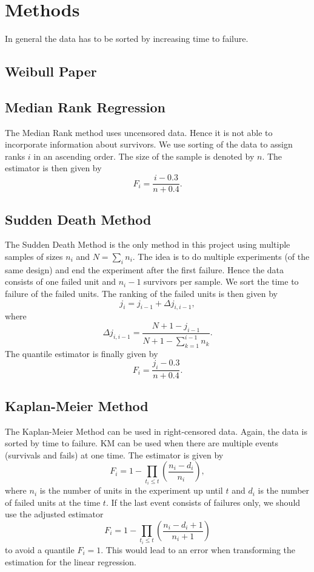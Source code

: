 \section{Methods}
In general the data has to be sorted by increasing time to failure.

\subsection{Weibull Paper}

\subsection{Median Rank Regression}
The Median Rank method uses uncensored data. Hence it is not able to incorporate information about survivors. 
We use sorting of the data to assign ranks $i$ in an ascending order. The size of the sample is denoted by $n$. The estimator is then given by
$$ F_i = \frac{i - 0.3}{n + 0.4}.$$

\subsection{Sudden Death Method}
The Sudden Death Method is the only method in this project using multiple samples of sizes $n_i$ and $N = \sum_{i}n_i$. The idea is to do multiple experiments (of the same design) and end the experiment after the first failure. Hence the data consists of one failed unit and $n_i - 1$ survivors per sample. We sort the time to failure of the failed units. The ranking of the failed units is then given by
$$ j_i = j_{i-1} + \Delta j_{i,i-1}, $$
where
$$ \Delta j_{i, i-1} = \frac{N + 1 - j_{i-1}}{N + 1 - \sum_{k=1}^{i-1} n_k}.$$
The quantile estimator is finally given by
$$ F_i = \frac{j_i - 0.3}{n + 0.4}. $$

\subsection{Kaplan-Meier Method}
The Kaplan-Meier Method can be used in right-censored data. Again, the data is sorted by time to failure. KM can be used when there are multiple events (survivals and fails) at one time.
The estimator is given by
$$ F_i = 1 - \prod_{t_i \leq t} \left( \frac{n_i - d_i}{n_i} \right), $$
where $n_i$ is the number of units in the experiment up until $t$ and $d_i$ is the number of failed units at the time $t$.
If the last event consists of failures only, we should use the adjusted estimator
$$ F_i = 1 - \prod_{t_i \leq t} \left( \frac{n_i - d_i + 1}{n_i + 1} \right) $$
to avoid a quantile $F_i = 1$. This would lead to an error when transforming the estimation for the linear regression.

